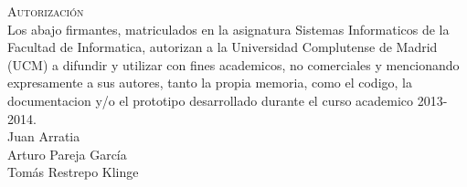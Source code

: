 

\textsc {\Large Autorizaci\'on }\\[1.5cm]

Los abajo firmantes, matriculados en la asignatura Sistemas Informaticos de la
Facultad de Informatica, autorizan a la Universidad Complutense de Madrid (UCM)
a difundir y utilizar con fines academicos, no comerciales y mencionando
expresamente a sus autores, tanto la propia memoria, como el codigo, la
documentacion y/o el prototipo desarrollado durante el curso academico
2013-2014.\\[3.0cm]

Juan Arratia \\[3.0cm]

Arturo Pareja Garc\'ia \\[3.0cm]

Tom\'as Restrepo Klinge 




